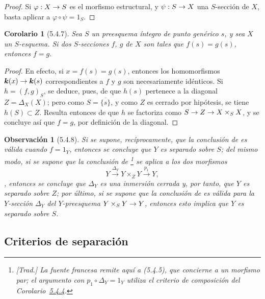 \documentclass[oneside]{amsart}
\theoremstyle{ega-env-style}
\theoremstyle{ega-thm-env-style}
\newtheorem*{corollary}{Corolario}
\theoremstyle{ega-defn-env-style}
\newtheorem*{remark}{Observación}
\renewcommand{\to}{\mathchoice{\longrightarrow}{\rightarrow}{\rightarrow}{\rightarrow}}
\let\EGAOriginalLabel\label
\renewcommand{\label}[1]{\phantomsection\EGAOriginalLabel{#1}}
\begin{document}
\begin{proof}
Si $\varphi:X\to S$ es el morfismo estructural, y $\psi:S\to X$ una $S$-sección de $X$, basta aplicar  a $\varphi\circ\psi=1_S$.
\end{proof}

\begin{corollary}[5.4.7]
\label{I.5.4.7}
Sea $S$ un preesquema íntegro de punto genérico $s$, y sea $X$ un $S$-esquema.
Si dos $S$-secciones $f$, $g$ de $X$ son tales que $f(s)=g(s)$, entonces $f=g$.
\end{corollary}

\begin{proof}
En efecto, si $x=f(s)=g(s)$, entonces los homomorfismos $\boldsymbol{k}(x)\to\boldsymbol{k}(s)$ correspondientes a $f$ y $g$ son necesariamente idénticos.
Si $h=(f,g)_S$, se deduce, pues, de  que $h(s)$ pertenece a la diagonal $Z=\Delta_X(X)$;
pero como $S=\overline{\{s\}}$, y como $Z$ es cerrado por hipótesis, se tiene $h(S)\subset Z$.
Resulta entonces de  que $h$ se factoriza como $S\to Z\to X\times_S X$, y se concluye así que $f=g$, por definición de la diagonal.
\end{proof}

\begin{remark}[5.4.8]
\label{I.5.4.8}
Si se supone, recíprocamente, que la conclusión de  es válida cuando $f=1_Y$, entonces se concluye que $Y$ es separado sobre $S$;
del mismo modo, si se supone que la conclusión de \footnote{\emph{[Trad.] La fuente francesa remite aquí a (5.4.5), que concierne a un morfismo par; el argumento con $p_1\circ\Delta_Y=1_Y$ utiliza el criterio de composición del Corolario~\hyperref[I.5.4.4]{5.4.4}.}} se aplica a los dos morfismos \[
  Y\xrightarrow{\Delta_Y}Y\times_Z Y\xrightarrow{p_1}Y,
\], entonces se concluye que $\Delta_Y$ es una inmersión cerrada y, por tanto, que $Y$ es separado sobre $Z$;
por último, si se supone que la conclusión de  es válida para la $Y$-sección $\Delta_Y$ del $Y$-preesquema $Y\times_S Y\to Y$, entonces esto implica que $Y$ es separado sobre $S$.
\end{remark}

\subsection{Criterios de separación}
\label{subsection:I.5.5}
\end{document}
